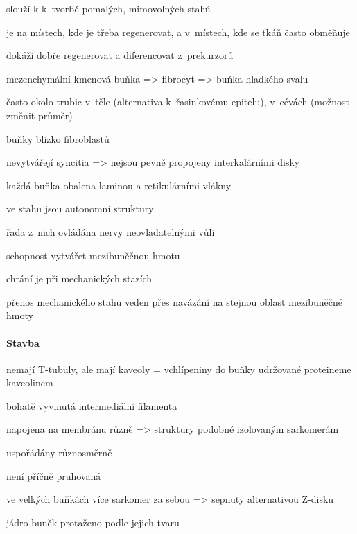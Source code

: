 \documentclass[DIV=8]{scrreprt}
\begin{document}
\begin{myItemize}[nosep]
    \item slouží k k tvorbě pomalých, mimovolných stahů
    \item je na místech, kde je třeba regenerovat, a v místech, kde se tkáň často obměňuje
\begin{myItemize}[nosep]
    \item dokáží dobře regenerovat a diferencovat z prekurzorů
    \item mezenchymální kmenová buňka => fibrocyt => buňka hladkého svalu
\end{myItemize}

    \item často okolo trubic v těle (alternativa k řasinkovému epitelu), v cévách (možnost změnit průměr)
    \item buňky blízko fibroblastů
    \item nevytvářejí syncitia => nejsou pevně propojeny interkalárními disky
    \item každá buňka obalena laminou a retikulárními vlákny
    \item ve stahu jsou autonomní struktury
\begin{myItemize}[nosep]
    \item řada z nich ovládána nervy neovladatelnými vůlí
\end{myItemize}

    \item schopnost vytvářet mezibuněčnou hmotu
\begin{myItemize}[nosep]
    \item chrání je při mechanických stazích
    \item přenos mechanického stahu veden přes navázání na stejnou oblast mezibuněčné hmoty
\end{myItemize}

\end{myItemize}



\paragraph{Stavba}
\begin{myItemize}[nosep]
    \item nemají T-tubuly, ale mají kaveoly = vchlípeniny do buňky udržované proteineme kaveolinem
    \item bohatě vyvinutá intermediální filamenta
\begin{myItemize}[nosep]
    \item napojena na membránu různě => struktury podobné izolovaným sarkomerám
    \item uspořádány různosměrně
    \item není příčně pruhovaná
\end{myItemize}

    \item ve velkých buňkách více sarkomer za sebou => sepnuty alternativou Z-disku
    \item jádro buněk protaženo podle jejich tvaru
\end{myItemize}
\end{document}
